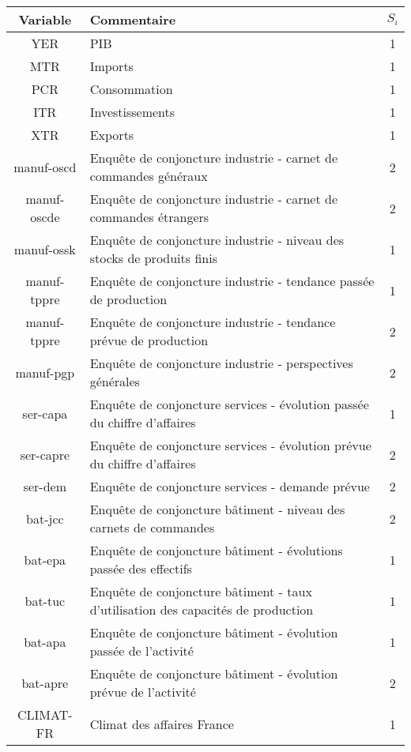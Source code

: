 \documentclass[10pt,french,french]{article}
\begin{document}
\begin{center}
   \begin{tabular}{ | c | l | c|}
     \hline
     \textbf{Variable} & \textbf{Commentaire} & $S_i$ \\ \hline
     YER & PIB & 1\\ \hline
     MTR & Imports & 1 \\ \hline
     PCR & Consommation & 1\\ \hline
     ITR & Investissements & 1 \\ \hline
     XTR & Exports & 1 \\ \hline
     manuf-oscd & Enquête de conjoncture industrie -  carnet de commandes généraux & 2 \\ \hline
     manuf-oscde & Enquête de conjoncture industrie - carnet de commandes étrangers & 2 \\ \hline
     manuf-ossk & Enquête de conjoncture industrie - niveau des stocks de produits finis & 1\\ \hline
     manuf-tppre & Enquête de conjoncture industrie - tendance passée de production & 1\\ \hline
     manuf-tppre & Enquête de conjoncture industrie - tendance prévue de production & 2\\ \hline
     manuf-pgp & Enquête de conjoncture industrie - perspectives générales & 2\\ \hline
     ser-capa & Enquête de conjoncture services - évolution passée du chiffre d'affaires & 1\\ \hline
     ser-capre & Enquête de conjoncture services - évolution prévue du chiffre d'affaires & 2\\ \hline
     ser-dem & Enquête de conjoncture services - demande prévue  & 2\\ \hline
     bat-jcc & Enquête de conjoncture bâtiment - niveau des carnets de commandes & 2 \\ \hline
     bat-epa & Enquête de conjoncture bâtiment - évolutions passée des effectifs & 1\\ \hline
     bat-tuc & Enquête de conjoncture bâtiment - taux d'utilisation des capacités de production & 1\\ \hline
     bat-apa & Enquête de conjoncture bâtiment - évolution passée de l'activité & 1 \\ \hline
     bat-apre & Enquête de conjoncture bâtiment -  évolution prévue de l'activité & 2\\ \hline
     CLIMAT-FR & Climat des affaires France & 1 \\ \hline

\end{tabular}
\end{center}
\end{document}
